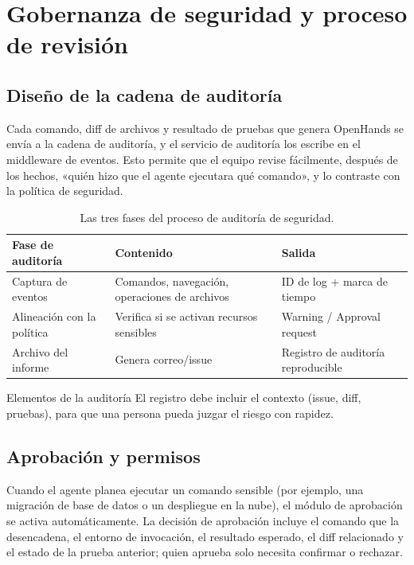 \section{Gobernanza de seguridad y proceso de revisión}
\subsection{Diseño de la cadena de auditoría}
Cada comando, diff de archivos y resultado de pruebas que genera OpenHands se envía a la cadena de auditoría, y el servicio de auditoría los escribe en el middleware de eventos. Esto permite que el equipo revise fácilmente, después de los hechos, «quién hizo que el agente ejecutara qué comando», y lo contraste con la política de seguridad.

\begin{table}[H]
\centering
\begin{tabular}{p{} p{} p{}}
\toprule
Fase de auditoría & Contenido & Salida \\
\midrule
Captura de eventos & Comandos, navegación, operaciones de archivos & ID de log + marca de tiempo \\
\midrule
Alineación con la política & Verifica si se activan recursos sensibles & Warning / Approval request \\
\midrule
Archivo del informe & Genera correo/issue & Registro de auditoría reproducible \\
\bottomrule
\end{tabular}
\caption{Las tres fases del proceso de auditoría de seguridad.}
\end{table}

\begin{importantbox}{Elementos de la auditoría}
El registro debe incluir el contexto (issue, diff, pruebas), para que una persona pueda juzgar el riesgo con rapidez.
\end{importantbox}

\subsection{Aprobación y permisos}
Cuando el agente planea ejecutar un comando sensible (por ejemplo, una migración de base de datos o un despliegue en la nube), el módulo de aprobación se activa automáticamente. La decisión de aprobación incluye el comando que la desencadena, el entorno de invocación, el resultado esperado, el diff relacionado y el estado de la prueba anterior; quien aprueba solo necesita confirmar o rechazar.

